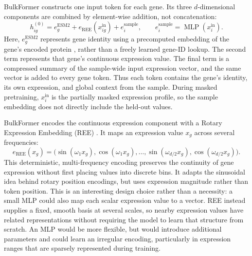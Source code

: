 \documentclass[11pt]{article}
\begin{document}
BulkFormer constructs one input token for each gene. Its three
$d$-dimensional components are combined by element-wise addition, not
concatenation:
\begin{equation}
    h_{ig}^{(0)}
    = e_g^{\mathrm{ESM2}}
    + e_{\mathrm{REE}}(x_{ig}^{\mathrm{in}})
    + e_i^{\mathrm{sample}},
    \qquad
    e_i^{\mathrm{sample}}
    = \operatorname{MLP}(x_i^{\mathrm{in}}).
\end{equation}
Here, $e_g^{\mathrm{ESM2}}$ represents gene identity using a precomputed
embedding of the gene's encoded protein \cite{lin2023evolutionary}, rather than
a freely learned gene-ID lookup. The second term represents that gene's
continuous expression value. The final term is a compressed summary of the
sample-wide input expression vector, and the same vector is added to every gene
token. Thus each token contains the gene's identity, its own expression, and
global context from the sample. During masked pretraining,
$x_i^{\mathrm{in}}$ is the partially masked expression profile, so the sample
embedding does not directly include the held-out values.

BulkFormer encodes the continuous expression component with a Rotary Expression
Embedding (REE) \cite{kang2026bulkformer}. It maps an expression value $x_g$
across several frequencies:
\begin{equation}
    e_{\mathrm{REE}}(x_g)
    = \bigl(
        \sin(\omega_1x_g),\cos(\omega_1x_g),\ldots,
        \sin(\omega_{d/2}x_g),\cos(\omega_{d/2}x_g)
      \bigr).
\end{equation}
This deterministic, multi-frequency encoding preserves the continuity of gene
expression without first placing values into discrete bins. It adapts the
sinusoidal idea behind rotary position encodings, but uses expression magnitude
rather than token position.
This is an interesting design choice rather than a necessity: a small MLP could
also map each scalar expression value to a vector. REE instead supplies a
fixed, smooth basis at several scales, so nearby expression values have related
representations without requiring the model to learn that structure from
scratch. An MLP would be more flexible, but would introduce additional
parameters and could learn an irregular encoding, particularly in expression
ranges that are sparsely represented during training.
\end{document}
